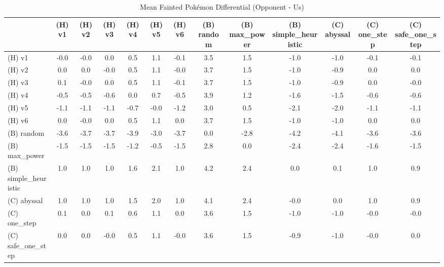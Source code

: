 \begin{table}[htbp]
\caption{Mean Fainted Pokémon Differential (Opponent - Us)}
\label{tab:fainted_diff}
\begin{tabular}{lcccccccccccc}
\hline
 & (H) v1 & (H) v2 & (H) v3 & (H) v4 & (H) v5 & (H) v6 & (B) random & (B) max\_power & (B) simple\_heuristic & (C) abyssal & (C) one\_step & (C) safe\_one\_step \\
\hline
(H) v1 & -0.0 & -0.0 & 0.0 & 0.5 & 1.1 & -0.1 & 3.5 & 1.5 & -1.0 & -1.0 & -0.1 & -0.1 \\
(H) v2 & 0.0 & 0.0 & -0.0 & 0.5 & 1.1 & -0.0 & 3.7 & 1.5 & -1.0 & -0.9 & 0.0 & 0.0 \\
(H) v3 & 0.1 & -0.0 & 0.0 & 0.5 & 1.1 & -0.1 & 3.7 & 1.5 & -1.0 & -0.9 & 0.0 & -0.0 \\
(H) v4 & -0.5 & -0.5 & -0.6 & 0.0 & 0.7 & -0.5 & 3.9 & 1.2 & -1.6 & -1.5 & -0.6 & -0.6 \\
(H) v5 & -1.1 & -1.1 & -1.1 & -0.7 & -0.0 & -1.2 & 3.0 & 0.5 & -2.1 & -2.0 & -1.1 & -1.1 \\
(H) v6 & 0.0 & -0.0 & 0.0 & 0.5 & 1.1 & 0.0 & 3.7 & 1.5 & -1.0 & -1.0 & 0.0 & 0.0 \\
(B) random & -3.6 & -3.7 & -3.7 & -3.9 & -3.0 & -3.7 & 0.0 & -2.8 & -4.2 & -4.1 & -3.6 & -3.6 \\
(B) max\_power & -1.5 & -1.5 & -1.5 & -1.2 & -0.5 & -1.5 & 2.8 & 0.0 & -2.4 & -2.4 & -1.6 & -1.5 \\
(B) simple\_heuristic & 1.0 & 1.0 & 1.0 & 1.6 & 2.1 & 1.0 & 4.2 & 2.4 & 0.0 & 0.1 & 1.0 & 0.9 \\
(C) abyssal & 1.0 & 1.0 & 1.0 & 1.5 & 2.0 & 1.0 & 4.1 & 2.4 & -0.0 & 0.0 & 1.0 & 0.9 \\
(C) one\_step & 0.1 & 0.0 & 0.1 & 0.6 & 1.1 & 0.0 & 3.6 & 1.5 & -1.0 & -1.0 & -0.0 & -0.0 \\
(C) safe\_one\_step & 0.0 & 0.0 & -0.0 & 0.5 & 1.1 & -0.0 & 3.6 & 1.5 & -0.9 & -1.0 & -0.0 & 0.0 \\
\hline
\end{tabular}
\end{table}
